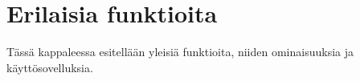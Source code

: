 \chapter{Erilaisia funktioita}

Tässä kappaleessa esitellään yleisiä funktioita, niiden ominaisuuksia ja käyttösovelluksia.

\section{}